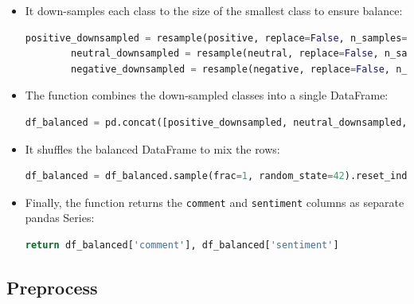 \documentclass{solutionclass} %
\begin{document}
\begin{solution}
\begin{itemize}
	\item It down-samples each class to the size of the smallest class to ensure balance:
	\begin{lstlisting}[language=Python]
		positive_downsampled = resample(positive, replace=False, n_samples=min_class_size, random_state=42)
		neutral_downsampled = resample(neutral, replace=False, n_samples=min_class_size, random_state=42)
		negative_downsampled = resample(negative, replace=False, n_samples=min_class_size, random_state=42)
	\end{lstlisting}
	
	\item The function combines the down-sampled classes into a single DataFrame:
	\begin{lstlisting}[language=Python]
		df_balanced = pd.concat([positive_downsampled, neutral_downsampled, negative_downsampled])
	\end{lstlisting}
	
	\item It shuffles the balanced DataFrame to mix the rows:
	\begin{lstlisting}[language=Python]
		df_balanced = df_balanced.sample(frac=1, random_state=42).reset_index(drop=True)
	\end{lstlisting}
	
	\item Finally, the function returns the \texttt{comment} and \texttt{sentiment} columns as separate pandas Series:
	\begin{lstlisting}[language=Python]
		return df_balanced['comment'], df_balanced['sentiment']
	\end{lstlisting}
\end{itemize}
\end{solution}




\subsection*{Preprocess}
\end{document}
